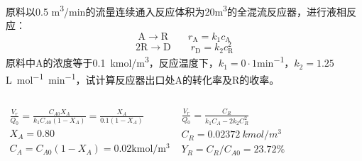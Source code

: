 \begin{frame}[t]
    \frametitle{}

    \begin{example}
        原料以0.5 \si{m^3/min}的流量连续通入反应体积为20\si{m^3}的全混流反应器，进行液相反应：
        \[
        \mathrm{A} \longrightarrow \mathrm{R} \qquad r_{\mathrm{A}}=k_{1} c_{\mathrm{A}}
        \]
        \[
        \mathrm{2R} \longrightarrow \mathrm{D} \qquad r_{\mathrm{D}}=k_{2} c_{\mathrm{R}}^2
        \]    
        原料中A的浓度等于\SI{0.1}{kmol/m^3}，反应温度下，$k_1=0·1$\si{min^{-1}}，$k_2=1.25$\si{L.mol^{-1}.min^{-1}}，试计算反应器出口处A的转化率及R的收率。
    \end{example}\pause
    \begin{columns}[c]
        \column{7.5cm}
        \large $\begin{array}{l}
        \frac{V_{r}}{Q_{0}}=\frac{C_{A 0} X_{A}}{k_{1} C_{A 0}(1-X_{A})}=\frac{X_{A}}{0.1(1-X_{A})}\\
    
        X_{A}=0.80\\
        
        C_{A}=C_{A 0}(1-X_{A})=0.02  \mathrm{kmol} / \mathrm{m}^{3}  
    \end{array}$
        \column{6cm}
        \large $\begin{array}{l}
            \frac{V_{r}}{Q_{0}}=\frac{C_{R}}{k_{1} C_{A}-2 k_{2} C_{R}^{2}}\\
        
            C_{R}= \SI{0.02372}{kmol/m^3}\\
        
            Y_{R}={C_{R}}/{C_{A 0}}=23.72\%
        \end{array}$
    \end{columns}

\end{frame}